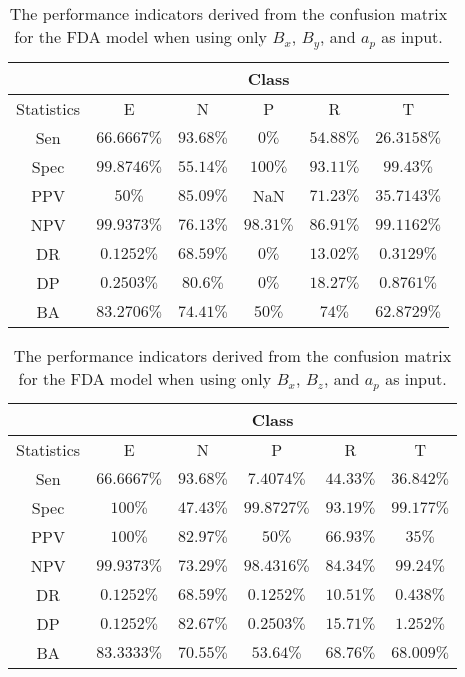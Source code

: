 \begin{table}[!ht]
	\centering
	\begin{tabular}{|c|c|c|c|c|c|}
		\hline
		 & \multicolumn{5}{c|}{Class} \\ \hline
		Statistics & E & N & P & R & T \\ \hline
		Sen & $66.6667\%$ & $93.68\%$ & $0\%$ & $54.88\%$ & $26.3158\%$ \\ \hline
		Spec & $99.8746\%$ & $55.14\%$ & $100\%$ & $93.11\%$ & $99.43\%$ \\ \hline
		PPV & $50\%$ & $85.09\%$ & NaN & $71.23\%$ & $35.7143\%$ \\ \hline
		NPV & $99.9373\%$ & $76.13\%$ & $98.31\%$ & $86.91\%$ & $99.1162\%$ \\ \hline
		DR & $0.1252\%$ & $68.59\%$ & $0\%$ & $13.02\%$ & $0.3129\%$ \\ \hline
		DP & $0.2503\%$ & $80.6\%$ & $0\%$ & $18.27\%$ & $0.8761\%$ \\ \hline
		BA & $83.2706\%$ & $74.41\%$ & $50\%$ & $74\%$ & $62.8729\%$ \\ \hline
	\end{tabular}
	\caption{The performance indicators derived from the confusion matrix for the FDA model when using only $B_{x}$, $B_{y}$, and $a_{p}$ as input.}
	\label{tab:cs:reverse:xyap:fda}
\end{table}

\begin{table}[!ht]
	\centering
	\begin{tabular}{|c|c|c|c|c|c|}
		\hline
		 & \multicolumn{5}{c|}{Class} \\ \hline
		Statistics & E & N & P & R & T \\ \hline
		Sen & $66.6667\%$ & $93.68\%$ & $7.4074\%$ & $44.33\%$ & $36.842\%$ \\ \hline
		Spec & $100\%$ & $47.43\%$ & $99.8727\%$ & $93.19\%$ & $99.177\%$ \\ \hline
		PPV & $100\%$ & $82.97\%$ & $50\%$ & $66.93\%$ & $35\%$ \\ \hline
		NPV & $99.9373\%$ & $73.29\%$ & $98.4316\%$ & $84.34\%$ & $99.24\%$ \\ \hline
		DR & $0.1252\%$ & $68.59\%$ & $0.1252\%$ & $10.51\%$ & $0.438\%$ \\ \hline
		DP & $0.1252\%$ & $82.67\%$ & $0.2503\%$ & $15.71\%$ & $1.252\%$ \\ \hline
		BA & $83.3333\%$ & $70.55\%$ & $53.64\%$ & $68.76\%$ & $68.009\%$ \\ \hline
	\end{tabular}
	\caption{The performance indicators derived from the confusion matrix for the FDA model when using only $B_{x}$, $B_{z}$, and $a_{p}$ as input.}
	\label{tab:cs:reverse:xzap:fda}
\end{table}

